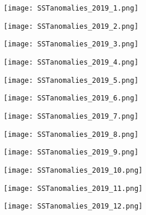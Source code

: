 \documentclass[11pt,a4paper,svgnames,draft]{beamer}
\newlength{\figwidth}
\begin{document}
\begin{tcbitemize}[raster columns=3,raster rows=4,raster height=1.2\linewidth,raster equal height,
raster every box/.style={size=normal,beamer,colbacktitle=myblue,colframe=myblue,colback=black,center title,fonttitle=\huge\cloudfont,toptitle=2mm,opacitybacktitle=.5}]

\tcbitem[title=January\vphantom{JMly}] \begin{figure}\centering \texttt{[image: SSTanomalies\_2019\_1.png]}\end{figure}
\tcbitem[title=February\vphantom{JMly}]\begin{figure}\centering\texttt{[image: SSTanomalies\_2019\_2.png]}\end{figure}
\tcbitem[title=March\vphantom{JMly}] \begin{figure}\centering\texttt{[image: SSTanomalies\_2019\_3.png]}\end{figure}
	
\tcbitem[title=April\vphantom{JMly}] \begin{figure}\centering\texttt{[image: SSTanomalies\_2019\_4.png]}\end{figure}
\tcbitem[title=May\vphantom{JMly}] \begin{figure}\centering\texttt{[image: SSTanomalies\_2019\_5.png]}\end{figure}
\tcbitem[title=June\vphantom{JMly}] \begin{figure}\centering\texttt{[image: SSTanomalies\_2019\_6.png]}\end{figure}

\tcbitem[title=July\vphantom{JMly}] \begin{figure}\centering\texttt{[image: SSTanomalies\_2019\_7.png]} \end{figure}
\tcbitem[title=August\vphantom{JMly}] \begin{figure}\centering\texttt{[image: SSTanomalies\_2019\_8.png]} \end{figure}
\tcbitem[title=September\vphantom{JMly}] \begin{figure}\centering\texttt{[image: SSTanomalies\_2019\_9.png]} \end{figure}

\tcbitem[title=October\vphantom{JMly}] \begin{figure}\centering\texttt{[image: SSTanomalies\_2019\_10.png]}\end{figure}
\tcbitem[title=November\vphantom{JMly}] \begin{figure}\centering\texttt{[image: SSTanomalies\_2019\_11.png]} \end{figure}
\tcbitem[title=December\vphantom{JMly}] \begin{figure}\centering\texttt{[image: SSTanomalies\_2019\_12.png]} \end{figure}
\end{tcbitemize}
\end{document}
